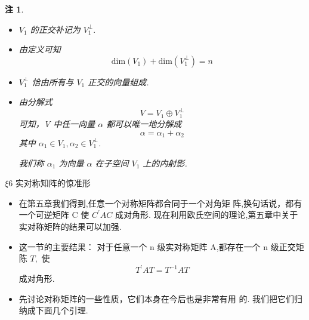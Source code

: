 \documentclass[13pt]{beamer}
\newtheorem*{rem}{注}
\begin{document}
\begin{frame}
\begin{rem}
\begin{itemize}
\item $V_{1}$ 的正交补记为 $V_{1}^{\perp} .$ 
\item 由定义可知
$$
\text{dim}\left(V_{1}\right)+\text{dim} \left(V_{1}^{\perp}\right)=n
$$

\item $V_{1}^{\perp}$ 恰由所有与 $V_{1}$ 正交的向量组成.

\item  由分解式
\[
V=V_{1} \oplus V_{1}^{\perp}
\]
可知，V 中任一向量 ${\alpha}$ 都可以唯一地分解成
\[
{\alpha}={\alpha}_{1}+{\alpha}_{2}
\]
其中 ${\alpha}_{1} \in V_{1}, {\alpha}_{2} \in V_{1}^{\perp}$. 

我们称 ${\alpha}_{1}$ 为向量 ${\alpha}$ 在子空间 $V_{1}$ 上的\alert{内射影}.
\end{itemize}
\end{rem}

\end{frame}



\begin{frame}{${\xi} {6} $ 实对称知阵的惊准形}
\begin{itemize}
\item 在第五章我们得到,任意一个对称矩阵都合同于一个对角矩 阵,换句话说，都有一个可逆矩阵 C 使 ${C}^{\prime} {A} {C}$
成对角形.
现在利用欧氏空间的理论,第五章中关于实对称矩阵的结果可以加强.

\item 这一节的主要结果： 对于任意一个 n 级实对称矩阵 A,都存在一个 n 级正交矩陈
${T},$ 使
\[
{T}^{\prime} {A} {T}={T}^{-1} {A} {T}
\]
成对角形. 

\item 先讨论对称矩阵的一些性质，它们本身在今后也是非常有用
的. 我们把它们归纳成下面几个引理.
\end{itemize}





\end{frame}
\end{document}
